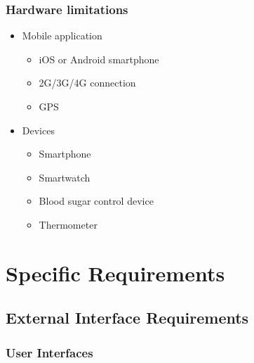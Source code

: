 \documentclass[12pt]{article}
\begin{document}
\subsubsection{Hardware limitations}
\begin{itemize}
    \item Mobile application
    \begin{itemize}
        \item iOS or Android smartphone
        \item 2G/3G/4G connection
        \item GPS
    \end{itemize}
    \item Devices
    \begin{itemize}
        \item Smartphone
        \item Smartwatch
        \item Blood sugar control device
        \item Thermometer
        
    \end{itemize}
\end{itemize}

\section{Specific Requirements}

\subsection{External Interface Requirements}

\subsubsection{User Interfaces}
\end{document}
